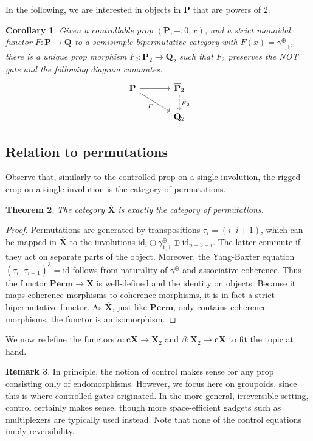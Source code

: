 \documentclass[a4paper]{article}
\theoremstyle{plain}
\newtheorem{theorem}{Theorem}
\newtheorem{corollary}[theorem]{Corollary}
\theoremstyle{definition}
\newtheorem{remark}[theorem]{Remark}
\newcommand{\cat}[1]{\mathbf{#1}}
\newcommand{\ccat}[1]{\mathbf{c #1}}
\newcommand{\scat}[1]{\mathbf{\ovl{#1}}}
\newcommand{\tcat}[1]{\mathbf{\ovl{#1}}_2}
\newcommand{\symplus}{\gamma^\oplus}
\newcommand{\iid}{\mathrm{id}}
\newcommand{\ovl}[1]{\overline{#1}}
\begin{document}
In the following, we are interested in objects in $\scat P$ that are powers of
$2$. 

\begin{corollary}
	\label{cor:suniv}
	Given a controllable prop $(\cat P, +, 0, x)$, and a strict monoidal
	functor $F \colon \cat P \to \cat Q$ to a semisimple bipermutative category
	with $F(x) = \symplus_{1,1}$, there is a unique prop morphism $\ovl F_2
	\colon \scat P_2 \to \cat Q_2$ such that $\ovl F_2$ preserves the NOT gate and
	the following diagram commutes.
	\[
		\begin{tikzcd}[column sep=large]
			\cat P & \scat P_2 \\
			& \cat Q_2
			\arrow[from=1-1, to=1-2]
			\arrow["F"', from=1-1, to=2-2]
			\arrow[dashed, "\ovl F_2", from=1-2, to=2-2]
		\end{tikzcd}
	\]
\end{corollary}

\subsection{Relation to permutations}
Observe that, similarly to the controlled prop on a single involution, the
rigged crop on a single involution is the category of permutations.

\begin{theorem}
	The category $\scat X$ is exactly the category of permutations.
\end{theorem}
\begin{proof}
	Permutations are generated by transpositions $\tau_i = (i \;\; i+1)$, which can
	be mapped in $\scat X$ to the involutions $\iid_i \oplus \symplus_{1,1} \oplus \iid_{n-3-i}$.
	The latter commute if they act on separate parts of the
	object. Moreover, the Yang-Baxter equation $(\tau_i\;\; \tau_{i+1})^3	= \iid$ follows from naturality of $\symplus$ and associative coherence.
	Thus the functor $\cat{Perm} \to \scat{X}$ is well-defined and the identity on objects.
 Because it
	maps coherence morphisms to coherence morphisms, it is in fact a strict
	bipermutative functor. As $\scat X$, just like $\cat{Perm}$, only
	contains coherence morphisms, the functor is an isomorphism.
\end{proof}

We now redefine the functors $\alpha \colon \ccat X \to \tcat X$ and $\beta
\colon \tcat X \to \ccat X$ to fit the topic at hand.

\begin{remark}
	In principle, the notion of control makes sense for any prop consisting
	only of endomorphisms. However, we focus here on groupoids, since this is
	where controlled gates originated. In the more general, irreversible
	setting, control certainly makes sense, though more space-efficient gadgets
	such as multiplexers are typically used instead. Note that none of the
	control equations imply reversibility.
\end{remark}
\end{document}
